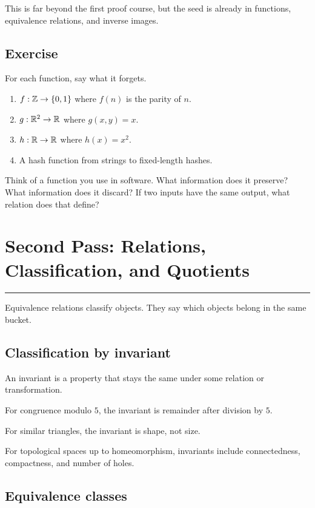 \documentclass[12pt]{article}
\newcommand{\chapterline}{\vspace{0.4em}\hrule\vspace{0.8em}}
\begin{document}
This is far beyond the first proof course, but the seed is already in functions, equivalence relations, and inverse images.

\subsection{Exercise}

For each function, say what it forgets.

\begin{enumerate}
\item $f:\mathbb{Z}\to\{0,1\}$ where $f(n)$ is the parity of $n$.
\item $g:\mathbb{R}^2\to\mathbb{R}$ where $g(x,y)=x$.
\item $h:\mathbb{R}\to\mathbb{R}$ where $h(x)=x^2$.
\item A hash function from strings to fixed-length hashes.
\end{enumerate}

\begin{walkbox}
Think of a function you use in software. What information does it preserve? What information does it discard? If two inputs have the same output, what relation does that define?
\end{walkbox}

\newpage
\section{Second Pass: Relations, Classification, and Quotients}
\chapterline

Equivalence relations classify objects. They say which objects belong in the same bucket.

\subsection{Classification by invariant}

An invariant is a property that stays the same under some relation or transformation.

For congruence modulo $5$, the invariant is remainder after division by $5$.

For similar triangles, the invariant is shape, not size.

For topological spaces up to homeomorphism, invariants include connectedness, compactness, and number of holes.

\subsection{Equivalence classes}
\end{document}
